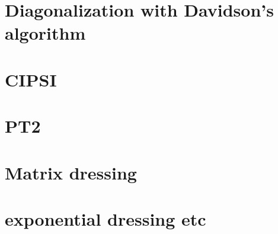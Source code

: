 \documentclass[12pt,a4paper]{report}
\begin{document}
\chapter{Diagonalization with Davidson's algorithm}
\minitoc


\chapter{CIPSI}
\minitoc


\chapter{PT2}
\minitoc



\chapter{Matrix dressing}
\minitoc



\chapter{exponential dressing etc}





\end{document}
